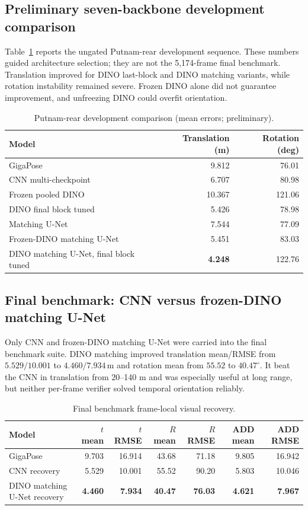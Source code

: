 \documentclass[11pt]{article}
\newcommand{\best}[1]{\textbf{#1}}
\newcommand{\unitm}{\,\mathrm{m}}
\newcommand{\unitdeg}{^{\circ}}
\begin{document}
\subsection{Preliminary seven-backbone development comparison}

Table~\ref{tab:devbackbones} reports the ungated Putnam-rear development sequence.  These numbers guided architecture selection; they are not the 5,174-frame final benchmark.  Translation improved for DINO last-block and DINO matching variants, while rotation instability remained severe.  Frozen DINO alone did not guarantee improvement, and unfreezing DINO could overfit orientation.

\begin{table}[H]
\centering
\caption{Putnam-rear development comparison (mean errors; preliminary).}
\label{tab:devbackbones}
\begin{tabular}{lrr}
\toprule
Model & Translation (m) & Rotation (deg)\\
\midrule
GigaPose & 9.812 & 76.01\\
CNN multi-checkpoint & 6.707 & 80.98\\
Frozen pooled DINO & 10.367 & 121.06\\
DINO final block tuned & 5.426 & 78.98\\
Matching U-Net & 7.544 & 77.09\\
Frozen-DINO matching U-Net & 5.451 & 83.03\\
DINO matching U-Net, final block tuned & \best{4.248} & 122.76\\
\bottomrule
\end{tabular}
\end{table}

\subsection{Final benchmark: CNN versus frozen-DINO matching U-Net}

Only CNN and frozen-DINO matching U-Net were carried into the final benchmark suite.  DINO matching improved translation mean/RMSE from $5.529/10.001$ to $4.460/7.934\unitm$ and rotation mean from $55.52$ to $40.47\unitdeg$.  It beat the CNN in translation from 20--140 m and was especially useful at long range, but neither per-frame verifier solved temporal orientation reliably.

\begin{table}[H]
\centering
\caption{Final benchmark frame-local visual recovery.}
\begin{tabular}{lrrrrrr}
\toprule
Model & $t$ mean & $t$ RMSE & $R$ mean & $R$ RMSE & ADD mean & ADD RMSE\\
\midrule
GigaPose & 9.703 & 16.914 & 43.68 & 71.18 & 9.805 & 16.942\\
CNN recovery & 5.529 & 10.001 & 55.52 & 90.20 & 5.803 & 10.046\\
DINO matching U-Net recovery & \best{4.460} & \best{7.934} & \best{40.47} & \best{76.03} & \best{4.621} & \best{7.967}\\
\bottomrule
\end{tabular}
\end{table}
\end{document}
